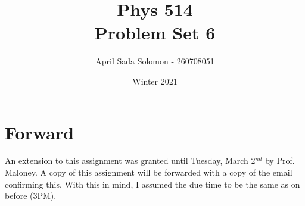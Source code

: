 \documentclass{article}
\title{Phys 514 \\
	\large Problem Set 6}
\author{April Sada Solomon - 260708051}
\date{Winter 2021}
\begin{document}
	\maketitle
	\thispagestyle{empty}
	\pagebreak
	
	\cfoot{\thepage}
	
	\tableofcontents
	\newpage
	
	
	\setcounter{page}{1}
	\cfoot{\thepage}
	
	\section*{Forward}
		An extension to this assignment was granted until Tuesday, March 2$^{nd}$ by Prof. Maloney. A copy of this assignment will be forwarded with a copy of the email confirming this. With this in mind, I assumed the due time to be the same as on before (3PM).
\end{document}

